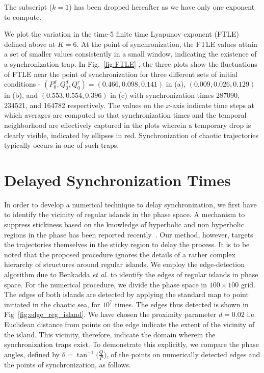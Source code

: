 \documentclass[reprint,amsmath,amssymb,aps,pre]{revtex4-1}
\begin{document}
The subscript ($k = 1$) has been dropped hereafter as we have only one 
exponent to compute.

We plot the variation in the time-5 finite time Lyapunov exponent (FTLE) 
defined above at $K = 6$. At the point of synchronization, the FTLE values 
attain a set of smaller values consistently in a small window, indicating the 
existence of a synchronization trap.  In Fig.~\ref{fig:FTLE} , the three plots 
show the fluctuations  of FTLE near the point of synchronization for three 
different sets of initial conditions - $(P^d_0,Q^d_0,Q^r_0) = 
(0.466,0.098,0.141)$ in (a), $(0.009,0.026,0.129)$ in (b), and 
$(0.553,0.554,0.396)$ in (c) with 
synchronization times 287090, 234521, and 164782 respectively. The values on 
the $x$-axis indicate time steps at which averages are computed so that 
synchronization times and the temporal neighborhood are effectively captured 
in the plots wherein a temporary drop is clearly visible, indicated by 
ellipses in red. Synchronization of chaotic trajectories typically occurs in 
one of such traps. 

\section{Delayed Synchronization Times}
\label{sec:delay}
In order to develop a numerical technique to delay synchronization, we  first 
have to identify the vicinity of regular islands in the phase space. A 
mechanism  to suppress stickiness based on the knowledge of hyperbolic and non 
hyperbolic regions in the phase has been reported recently~\cite{Kruger2015}. 
Our method, however, targets the trajectories themselves in the sticky region 
to delay the process.  It is to be noted that the proposed procedure ignores 
the details of a rather complex hierarchy of structures around regular 
islands. We employ the edge-detection algorithm due to Benkadda {\it et al.} 
\cite{Benkadda1997} to identify the edges of regular islands in phase space. 
For the numerical procedure, we divide the phase space in $100 \times 100$ 
grid. The edges of both islands are detected by applying the standard map 
to point initiated in the chaotic sea, for $10^7$ times.  The edges thus 
detected is shown in Fig~\ref{fig:edge_reg_island}.  We have chosen the 
proximity parameter $d=0.02$ i.e. Euclidean distance from points 
on the edge indicate the extent of the vicinity of the island.  This vicinity, 
therefore, indicate the domain wherein the synchronization traps exist.  To 
demonstrate this explicitly, we compare the phase angles, defined by $\theta = 
\tan^{-1}(\frac{Q}{P}$), of the points on numerically detected edges and 
the points of synchronization, as 
follows.
\end{document}
